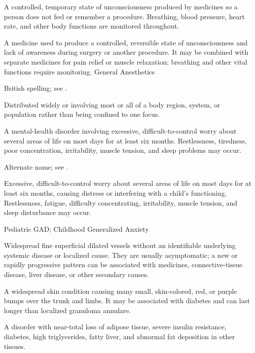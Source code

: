  A controlled, temporary state of unconsciousness produced by medicines so a person does not feel or remember a procedure. Breathing, blood pressure, heart rate, and other body functions are monitored throughout.

 A medicine used to produce a controlled, reversible state of unconsciousness and lack of awareness during surgery or another procedure. It may be combined with separate medicines for pain relief or muscle relaxation; breathing and other vital functions require monitoring.
\synonyms
General Anesthetics

 British spelling; see .

 Distributed widely or involving most or all of a body region, system, or population rather than being confined to one focus.

 A mental-health disorder involving excessive, difficult-to-control worry about several areas of life on most days for at least six months. Restlessness, tiredness, poor concentration, irritability, muscle tension, and sleep problems may occur.

 Alternate name; see .

 Excessive, difficult-to-control worry about several areas of life on most days for at least six months, causing distress or interfering with a child’s functioning. Restlessness, fatigue, difficulty concentrating, irritability, muscle tension, and sleep disturbance may occur.

\synonyms
Pediatric GAD; Childhood Generalized Anxiety

 Widespread fine superficial dilated vessels without an identifiable underlying systemic disease or localized cause. They are usually asymptomatic; a new or rapidly progressive pattern can be associated with medicines, connective-tissue disease, liver disease, or other secondary causes.

 A widespread skin condition causing many small, skin-colored, red, or purple bumps over the trunk and limbs. It may be associated with diabetes and can last longer than localized granuloma annulare.

 A disorder with near-total loss of adipose tissue, severe insulin resistance, diabetes, high triglycerides, fatty liver, and abnormal fat deposition in other tissues.

